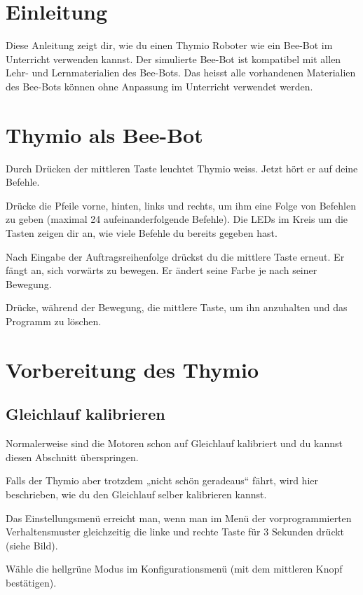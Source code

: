 \documentclass[12pt]{article}
\begin{document}


\section*{Einleitung}
Diese Anleitung zeigt dir, wie du einen Thymio Roboter wie ein Bee-Bot im Unterricht verwenden kannst. Der simulierte Bee-Bot ist kompatibel mit allen Lehr- und Lernmaterialien des Bee-Bots. Das heisst alle vorhandenen Materialien des Bee-Bots können ohne Anpassung im Unterricht verwendet werden.

\section*{Thymio als Bee-Bot}

Durch Drücken der mittleren Taste leuchtet Thymio weiss. Jetzt hört er auf deine Befehle.

Drücke die Pfeile vorne, hinten, links und rechts, um ihm eine Folge von Befehlen zu geben (maximal 24 aufeinanderfolgende Befehle). Die LEDs im Kreis um die Tasten zeigen dir an, wie viele Befehle du bereits gegeben hast.

Nach Eingabe der Auftragsreihenfolge drückst du die mittlere Taste erneut. Er fängt an, sich vorwärts zu bewegen. Er ändert seine Farbe je nach seiner Bewegung.

Drücke, während der Bewegung, die mittlere Taste, um ihn anzuhalten und das Programm zu löschen.

\section*{Vorbereitung des Thymio}
\subsection*{Gleichlauf kalibrieren}
Normalerweise sind die Motoren schon auf Gleichlauf kalibriert und du kannst diesen Abschnitt überspringen.

Falls der Thymio aber trotzdem „nicht schön geradeaus“ fährt, wird hier beschrieben, wie du den Gleichlauf selber kalibrieren kannst.

Das Einstellungsmenü erreicht man, wenn man im Menü der vorprogrammierten Verhaltensmuster gleichzeitig die linke und rechte Taste für 3 Sekunden drückt (siehe Bild).

Wähle die hellgrüne Modus im Konfigurationsmenü (mit dem mittleren Knopf bestätigen). 
\end{document}
